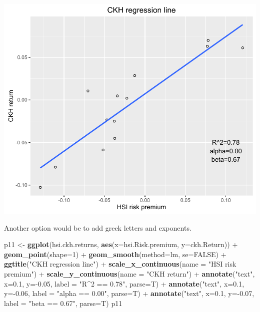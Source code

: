 \documentclass[]{article}
\newenvironment{Shaded}{\begin{snugshade}}{\end{snugshade}}
\newcommand{\KeywordTok}[1]{\textcolor[rgb]{0.13,0.29,0.53}{\textbf{{#1}}}}
\newcommand{\DataTypeTok}[1]{\textcolor[rgb]{0.13,0.29,0.53}{{#1}}}
\newcommand{\DecValTok}[1]{\textcolor[rgb]{0.00,0.00,0.81}{{#1}}}
\newcommand{\FloatTok}[1]{\textcolor[rgb]{0.00,0.00,0.81}{{#1}}}
\newcommand{\StringTok}[1]{\textcolor[rgb]{0.31,0.60,0.02}{{#1}}}
\newcommand{\OtherTok}[1]{\textcolor[rgb]{0.56,0.35,0.01}{{#1}}}
\newcommand{\NormalTok}[1]{{#1}}
\begin{document}
\begin{center}\includegraphics{11_Linear_Regression_Plot_pdf/lr_10-1} \end{center}

Another option would be to add greek letters and exponents.

\begin{Shaded}
\begin{Highlighting}[]
\NormalTok{p11 <-}\StringTok{ }\KeywordTok{ggplot}\NormalTok{(hsi.ckh.returns, }\KeywordTok{aes}\NormalTok{(}\DataTypeTok{x=}\NormalTok{hsi.Risk.premium, }\DataTypeTok{y=}\NormalTok{ckh.Return)) +}\StringTok{ }\KeywordTok{geom_point}\NormalTok{(}\DataTypeTok{shape=}\DecValTok{1}\NormalTok{) +}\StringTok{ }
\StringTok{  }\KeywordTok{geom_smooth}\NormalTok{(}\DataTypeTok{method=}\NormalTok{lm, }\DataTypeTok{se=}\OtherTok{FALSE}\NormalTok{) +}\StringTok{ }\KeywordTok{ggtitle}\NormalTok{(}\StringTok{"CKH regression line"}\NormalTok{) +}
\StringTok{  }\KeywordTok{scale_x_continuous}\NormalTok{(}\DataTypeTok{name =} \StringTok{"HSI risk premium"}\NormalTok{) +}
\StringTok{  }\KeywordTok{scale_y_continuous}\NormalTok{(}\DataTypeTok{name =} \StringTok{"CKH return"}\NormalTok{) +}\StringTok{ }
\StringTok{  }\KeywordTok{annotate}\NormalTok{(}\StringTok{"text"}\NormalTok{, }\DataTypeTok{x=}\FloatTok{0.1}\NormalTok{, }\DataTypeTok{y=}\NormalTok{-}\FloatTok{0.05}\NormalTok{, }\DataTypeTok{label =} \StringTok{"R^2 == 0.78"}\NormalTok{, }\DataTypeTok{parse=}\NormalTok{T) +}\StringTok{ }
\StringTok{  }\KeywordTok{annotate}\NormalTok{(}\StringTok{"text"}\NormalTok{, }\DataTypeTok{x=}\FloatTok{0.1}\NormalTok{, }\DataTypeTok{y=}\NormalTok{-}\FloatTok{0.06}\NormalTok{, }\DataTypeTok{label =} \StringTok{"alpha == 0.00"}\NormalTok{, }\DataTypeTok{parse=}\NormalTok{T) +}\StringTok{ }
\StringTok{  }\KeywordTok{annotate}\NormalTok{(}\StringTok{"text"}\NormalTok{, }\DataTypeTok{x=}\FloatTok{0.1}\NormalTok{, }\DataTypeTok{y=}\NormalTok{-}\FloatTok{0.07}\NormalTok{, }\DataTypeTok{label =} \StringTok{"beta == 0.67"}\NormalTok{, }\DataTypeTok{parse=}\NormalTok{T)}
\NormalTok{p11}
\end{Highlighting}
\end{Shaded}
\end{document}
